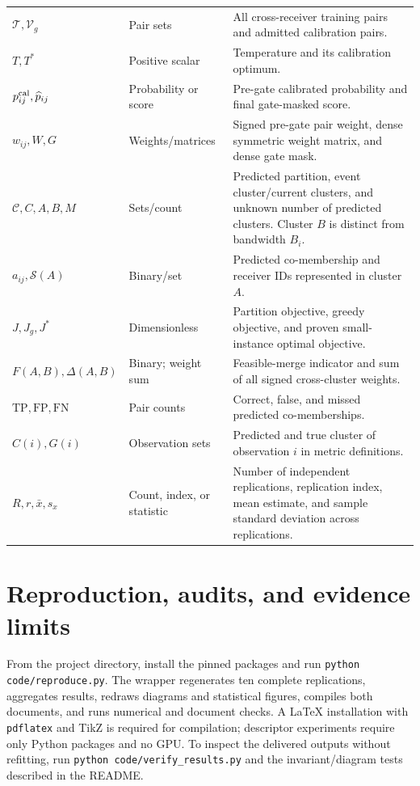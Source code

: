 \documentclass[10pt,a4paper]{article}
\begin{document}
\begin{longtable}{@{}>{\raggedright\arraybackslash}p{3.0cm}>{\raggedright\arraybackslash}p{2.5cm}>{\raggedright\arraybackslash}p{10.5cm}@{}}
$\mathcal T,\mathcal V_g$ & Pair sets & All cross-receiver training pairs and admitted calibration pairs. \\
$T,T^*$ & Positive scalar & Temperature and its calibration optimum. \\
$p^{\rm cal}_{ij},\widehat p_{ij}$ & Probability or score & Pre-gate calibrated probability and final gate-masked score. \\
$w_{ij},W,G$ & Weights/matrices & Signed pre-gate pair weight, dense symmetric weight matrix, and dense gate mask. \\
$\mathcal C,C,A,B,M$ & Sets/count & Predicted partition, event cluster/current clusters, and unknown number of predicted clusters. Cluster $B$ is distinct from bandwidth $B_i$. \\
$a_{ij},\mathcal S(A)$ & Binary/set & Predicted co-membership and receiver IDs represented in cluster $A$. \\
$J,J_g,J^*$ & Dimensionless & Partition objective, greedy objective, and proven small-instance optimal objective. \\
$F(A,B),\Delta(A,B)$ & Binary; weight sum & Feasible-merge indicator and sum of all signed cross-cluster weights. \\
$\mathrm{TP},\mathrm{FP},\mathrm{FN}$ & Pair counts & Correct, false, and missed predicted co-memberships. \\
$C(i),G(i)$ & Observation sets & Predicted and true cluster of observation $i$ in metric definitions. \\
$R,r,\bar x,s_x$ & Count, index, or statistic & Number of independent replications, replication index, mean estimate, and sample standard deviation across replications. \\
\end{longtable}
\normalsize

\section{Reproduction, audits, and evidence limits}
From the project directory, install the pinned packages and run \texttt{python code/reproduce.py}. The wrapper regenerates ten complete replications, aggregates results, redraws diagrams and statistical figures, compiles both documents, and runs numerical and document checks. A LaTeX installation with \texttt{pdflatex} and TikZ is required for compilation; descriptor experiments require only Python packages and no GPU. To inspect the delivered outputs without refitting, run \texttt{python code/verify\_results.py} and the invariant/diagram tests described in the README.
\end{document}
